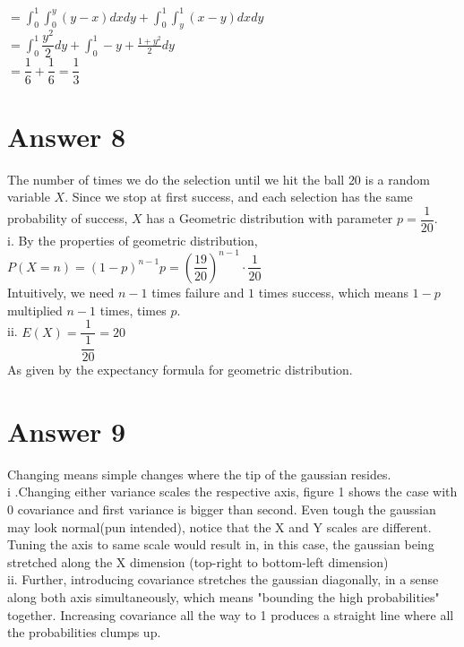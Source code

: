 \documentclass[12pt]{article}
\begin{document}
$ =  \displaystyle \int_0^1 \int_0^y (y-x) dx dy  +  \displaystyle \int_0^1 \int_y^1 (x-y) dx dy $ \\

$ =    \displaystyle \int_0^1 \dfrac{y^2}{2} dy  +  \displaystyle \int_0^1 -y+\frac{1+y^2}{2} dy $ \\

$ = \dfrac{1}{6} + \dfrac{1}{6} = \dfrac{1}{3} $

\section*{Answer 8}

The number of times we do the selection until we hit the ball $20$ is a random variable $X$. Since we stop at first success, and each selection has the same probability of success, $X$ has a Geometric distribution with parameter $p=\dfrac{1}{20}$. \\

i. By the properties of geometric distribution, $P(X=n) = (1-p)^{n-1}p = (\dfrac{19}{20})^{n-1}\cdot \dfrac{1}{20}$ \\

Intuitively, we need  $n-1$ times failure and $1$ times success, which means $1-p$ multiplied $n-1$ times, times $p$. \\

ii. $E(X) = \dfrac{1}{\dfrac{1}{20}} = 20 $ \\

As given by the expectancy formula for geometric distribution.\\



\section*{Answer 9}

Changing means simple changes where the tip of the gaussian resides. \\

i .Changing either variance scales the respective axis, figure 1 shows the case with 0 covariance and first variance is bigger than second. Even tough the gaussian may look normal(pun intended), notice that the X and Y scales are different. Tuning the axis to same scale would result in, in this case, the gaussian being stretched along the X dimension (top-right to bottom-left dimension)\\

ii. Further, introducing covariance stretches the gaussian diagonally, in a sense along both axis simultaneously, which means "bounding the high probabilities" together. Increasing covariance all the way to 1 produces a straight line where all the probabilities clumps up.
\end{document}
